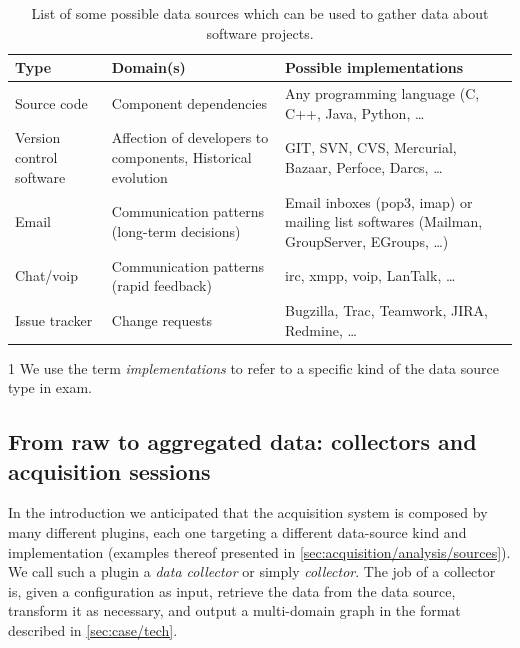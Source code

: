 \begin{table}
  \begin{threeparttable}
  \begin{tabularx}{\textwidth}{ p{2.3cm} | X | X }
    \toprule
    Type & Domain(s) & Possible implementations\tnote{1}\\[.7mm]
    \hline

    Source code & Component dependencies & Any programming language (C, C++, Java, Python, \ldots \\[3mm]
    Version control software & Affection of developers to components, Historical evolution & GIT, SVN, CVS, Mercurial, Bazaar, Perfoce, Darcs, \ldots \\[3mm]
    Email & Communication patterns (long-term decisions) & Email inboxes (\gls{pop3}, \gls{imap}) or mailing list softwares (Mailman, GroupServer, EGroups, \ldots) \\[3mm]
    Chat/\gls{voip} & Communication patterns (rapid feedback) & \gls{irc}, \gls{xmpp}, \gls{voip}, LanTalk, \ldots \\[3mm]
    Issue tracker & Change requests & Bugzilla, Trac, Teamwork, JIRA, Redmine, \ldots \\

    \bottomrule
  \end{tabularx}
  \vspace{1mm}
  \begin{tablenotes}
  \item [1] \footnotesize{We use the term \emph{implementations} to refer to a specific kind of the data source type in exam.}
  \end{tablenotes}
  \end{threeparttable}

  \caption[Possible data source types, domains and implementations]{List of some possible data sources which can be used to gather data about software projects.}
  \label{tab:sources}
\end{table}

\subsection{From raw to aggregated data: collectors and acquisition sessions}

In the introduction we anticipated that the acquisition system is composed by many different plugins, each one targeting a different data-source kind and implementation (examples thereof presented in \vref{sec:acquisition/analysis/sources}). We call such a plugin a \emph{data collector} or simply \emph{collector}. The job of a collector is, given a configuration as input, retrieve the data from the data source, transform it as necessary, and output a multi-domain graph in the format described in \vref{sec:case/tech}.

